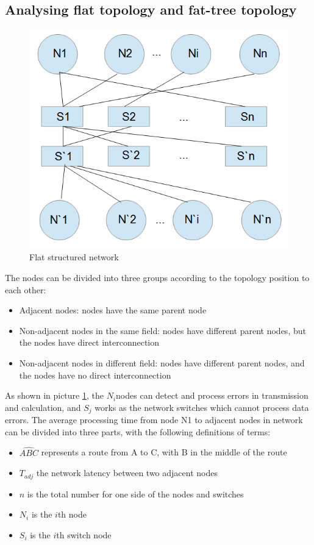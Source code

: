 \documentclass[11pt,openright,a4paper]{report}
\begin{document}
\subsection{Analysing flat topology and fat-tree topology}
\begin{figure}[H]
	\centering
    \includegraphics[width=0.4\linewidth]{picture/FlatStruct.PNG}
    \caption{Flat structured network}
    \label{fig:flat}
\end{figure}
The nodes can be divided into three groups according to the topology position to each other:
\begin{itemize}
	\item Adjacent nodes: nodes have the same parent node
    \item Non-adjacent nodes in the same field: nodes have different parent nodes, but the nodes have direct interconnection
    \item Non-adjacent nodes in different field: nodes have different parent nodes, and the nodes have no direct interconnection
\end{itemize}
As shown in picture \ref{fig:flat}, the $N_{i}$nodes can detect and process errors in transmission and calculation, and $S_{j}$ works as the network switches which cannot process data errors. The average processing time from node N1 to adjacent nodes in network can be divided into three parts, with the following definitions of terms:\\
\begin{itemize}
	\item $\widehat{ABC}$ represents a route from A to C, with B in the middle of the route
	\item $T_{adj}$ the network latency between two adjacent nodes
	\item $n$ is the total number for one side of the nodes and switches
	\item $N_{i}$ is the $i$th node
	\item $S_{i}$ is the $i$th switch node
\end{itemize}
\end{document}
